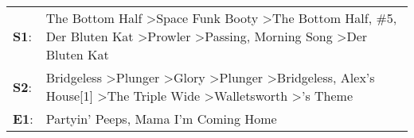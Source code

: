 \begin{supertabular}{p{0.03\textwidth}p{0.92\textwidth}}
 \textbf{S1}:  &              The Bottom Half\textsuperscript{} \textgreater \enspace Space Funk Booty\textsuperscript{} \textgreater \enspace The Bottom Half\textsuperscript{}, \enspace \#5\textsuperscript{}, \enspace Der Bluten Kat\textsuperscript{} \textgreater \enspace Prowler\textsuperscript{} \textgreater \enspace Passing\textsuperscript{}, \enspace Morning Song\textsuperscript{} \textgreater \enspace Der Bluten Kat\textsuperscript{}  \enspace  \\
 \textbf{S2}:  &  Bridgeless\textsuperscript{} \textgreater \enspace Plunger\textsuperscript{} \textgreater \enspace Glory\textsuperscript{} \textgreater \enspace Plunger\textsuperscript{} \textgreater \enspace Bridgeless\textsuperscript{}, \enspace Alex's House[1]\textsuperscript{} \textgreater \enspace The Triple Wide\textsuperscript{} \textgreater \enspace Walletsworth\textsuperscript{} \textgreater {}'s Theme\textsuperscript{}  \enspace  \\
 \textbf{E1}:  &                                                                                                                                                                                                                                                                                                                                                          Partyin' Peeps\textsuperscript{}, \enspace Mama I'm Coming Home\textsuperscript{}  \enspace  \\
\end{supertabular}
